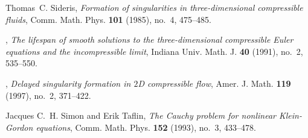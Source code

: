 \documentclass[12pt]{amsart}
\numberwithin{equation}{section} \numberwithin{theorem}{section}
\numberwithin{example}{section} \numberwithin{remark}{section}
\numberwithin{figure}{section} \numberwithin{algorithm}{section}
\begin{document}
\begin{thebibliography}{10}
Thomas~C. Sideris, \emph{Formation of singularities in three-dimensional
  compressible fluids}, Comm. Math. Phys. \textbf{101} (1985), no.~4, 475--485.

\bysame, \emph{The lifespan of smooth solutions to the three-dimensional
  compressible {E}uler equations and the incompressible limit}, Indiana Univ.
  Math. J. \textbf{40} (1991), no.~2, 535--550.

\bysame, \emph{Delayed singularity formation in {$2$}{D} compressible flow},
  Amer. J. Math. \textbf{119} (1997), no.~2, 371--422.

Jacques C.~H. Simon and Erik Taflin, \emph{The {C}auchy problem for nonlinear
  {K}lein-{G}ordon equations}, Comm. Math. Phys. \textbf{152} (1993), no.~3,
  433--478.

\end{thebibliography}
\end{document}
